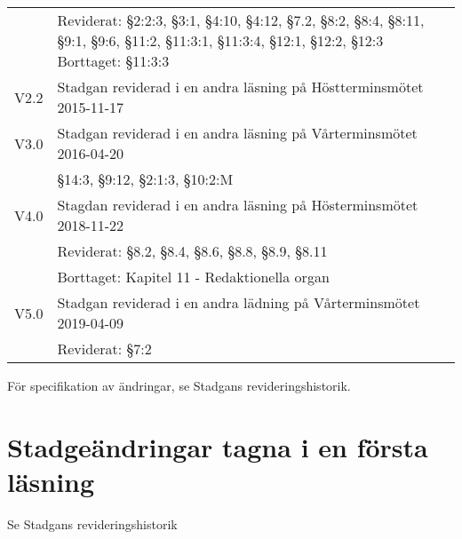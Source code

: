 \documentclass[10pt]{article}
\begin{document}
\begin{tabular}{p{7mm} p{110mm}}
        & Reviderat: §2:2:3, §3:1, §4:10, §4:12, §7.2, §8:2, §8:4, §8:11, §9:1, §9:6, §11:2, §11:3:1,
        §11:3:4, §12:1, §12:2, §12:3
        Borttaget: §11:3:3\\
        V2.2 & Stadgan reviderad i en andra läsning på Höstterminsmötet 2015-11-17\\
        V3.0 & Stadgan reviderad i en andra läsning på Vårterminsmötet 2016-04-20\\
        & \S14:3, \S9:12, \S2:1:3, \S10:2:M\\
        V4.0 & Stagdan reviderad i en andra läsning på Hösterminsmötet 2018-11-22\\
        & Reviderat: \S8.2, \S8.4, \S8.6, \S8.8, \S8.9, \S8.11\\
        & Borttaget: Kapitel 11 - Redaktionella organ\\
       V5.0 & Stadgan reviderad i en andra lädning på Vårterminsmötet 2019-04-09 \\ 
       & Reviderat: \S7:2 \\
    \end{tabular}
    \renewcommand*\arraystretch{1.3}
    
    För specifikation av ändringar, se Stadgans revideringshistorik.
    
    \section*{Stadgeändringar tagna i en första läsning}
    
    Se Stadgans revideringshistorik
    
    
\end{document}
